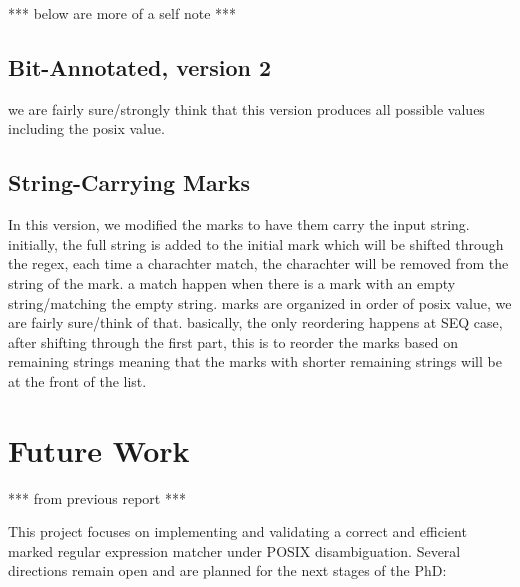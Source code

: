 \documentclass[12pt]{article}
\begin{document}
\newpage

*** below are more of a self note ***
\subsection{Bit-Annotated, version 2}
we are fairly sure/strongly think that this version produces all possible values including the posix value.
\subsection{String-Carrying Marks}
In this version, we modified the marks to have them carry the input string. initially, the full string is added to
the initial mark which will be shifted through the regex, each time a charachter match, the charachter will be removed
from the string of the mark. a match happen when there is a mark with an empty string/matching the empty string.
marks are organized in order of posix value, we are fairly sure/think of that. basically, the only reordering happens at
SEQ case, after shifting through the first part, this is to reorder the marks based on remaining strings meaning that
the marks with shorter remaining strings will be at the front of the list.


\section{Future Work}
*** from previous report ***

This project focuses on implementing and validating a correct and efficient marked regular expression matcher under POSIX disambiguation. Several directions remain open and are planned for the next stages of the PhD:
\end{document}
